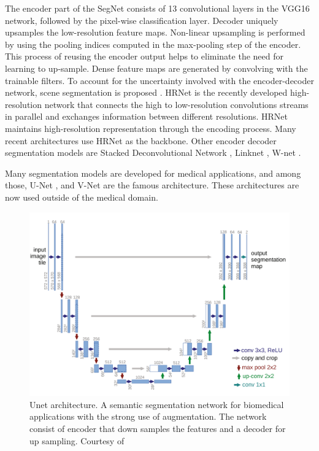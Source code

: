     The encoder part of the SegNet consists of 13 convolutional layers in the VGG16 network, followed by the pixel-wise classification layer. Decoder uniquely upsamples the low-resolution feature maps. Non-linear upsampling is performed by using the pooling indices computed in the max-pooling step of the encoder. This process of reusing the encoder output helps to eliminate the need for learning to up-sample. Dense feature maps are generated by convolving with the trainable filters. To account for the uncertainty involved with the encoder-decoder network, scene segmentation is proposed \cite{65_kendall2015bayesian}. HRNet \cite{66_sun2019high} is the recently developed high-resolution network that connects the high to low-resolution convolutions streams in parallel	and exchanges information between different resolutions. HRNet maintains high-resolution representation through the encoding process. Many recent architectures use HRNet as the backbone. Other encoder decoder segmentation models are Stacked Deconvolutional Network \cite{67_fu2019stacked}, Linknet \cite{68_hu2018learning}, W-net \cite{69_xia2017w}.

	Many segmentation models are developed for medical applications, and among those, U-Net \cite{70_ronneberger2015u}, and V-Net \cite{71_milletari2016v} are the famous architecture. These architectures are now used outside of the medical domain.
    
    \begin{figure}[h]
    	\centering
    	\includegraphics[width=14cm]{images/unet.png}
    	\caption{Unet architecture. A semantic segmentation network for biomedical applications with the strong use of augmentation. The network consist of encoder that down samples the features and a decoder for up sampling. Courtesy of \cite{70_ronneberger2015u}}
    	\label{fig:unet}
    \end{figure} 
	

